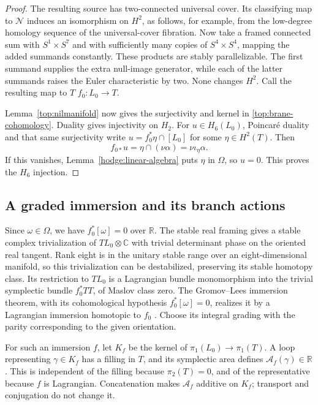 \documentclass[11pt]{article}
\theoremstyle{definition}
\theoremstyle{remark}
\newcommand{\R}{\mathbb R}
\newcommand{\C}{\mathbb C}
\numberwithin{equation}{section}
\begin{document}
\begin{proof}
The resulting source has two-connected universal cover.  Its
classifying map to $\mathcal N$ induces an isomorphism on $H^2$,
as follows, for example, from the low-degree homology sequence of the
universal-cover fibration.  Now take a framed connected sum with
$S^1\times S^7$ and with sufficiently many copies of
$S^4\times S^4$, mapping the added summands constantly.  These
products are stably parallelizable.  The first summand supplies the
extra null-image generator, while each of the latter summands raises
the Euler characteristic by two.  None changes $H^2$.  Call the
resulting map to $T$ $f_0:L_0\to T$.

Lemma~\ref{top:nilmanifold} now gives the surjectivity and kernel in
\eqref{top:brane-cohomology}.  Duality gives injectivity on $H_2$.
For $u\in H_6(L_0)$, Poincar\'e duality and that same surjectivity
write $u=f_0^*\eta\cap[L_0]$ for some $\eta\in H^2(T)$.  Then
\[
 f_{0*}u=\eta\cap(\nu\alpha)=\nu\iota_\eta\alpha.
\]
If this vanishes, Lemma~\ref{hodge:linear-algebra} puts $\eta$ in
$\Omega$, so $u=0$.  This proves the $H_6$ injection.
\end{proof}

\subsection{A graded immersion and its branch actions}

Since $\omega\in\Omega$, we have $f_0^*[\omega]=0$ over $\R$.
The stable real framing gives a stable complex trivialization of
$TL_0\otimes\C$ with trivial determinant phase on the oriented real
tangent.  Rank eight is in the unitary stable range over an
eight-dimensional manifold, so this trivialization can be
destabilized, preserving its stable homotopy class.  Its restriction
to $TL_0$ is a Lagrangian bundle monomorphism into the trivial
symplectic bundle $f_0^*TT$, of Maslov class zero.  The
Gromov--Lees immersion theorem, with its cohomological hypothesis
$f_0^*[\omega]=0$, realizes it by a Lagrangian immersion homotopic to
$f_0$ \cite[Theorem~2.3]{gromov-lees}.  Choose its integral grading
with the parity corresponding to the given orientation.

For such an immersion $f$, let $K_f$ be the kernel of
$\pi_1(L_0)\to\pi_1(T)$.  A loop representing $\gamma\in K_f$
has a filling in $T$, and its symplectic area defines
$\mathcal A_f(\gamma)\in\R$.  This is independent of the filling
because $\pi_2(T)=0$, and of the representative because $f$ is
Lagrangian.  Concatenation makes $\mathcal A_f$ additive on $K_f$;
transport and conjugation do not change it.
\end{document}
